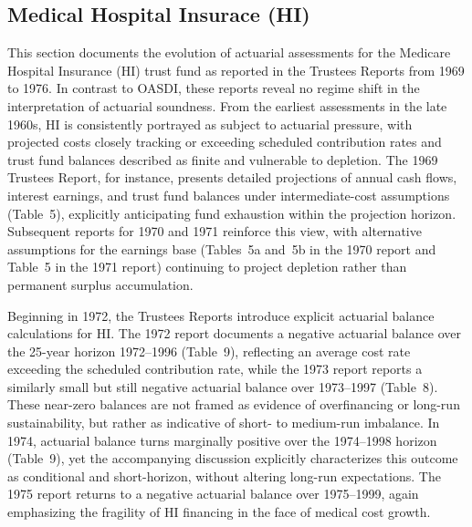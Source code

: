 \documentclass[12pt]{article}%
\theoremstyle{remark}
\begin{document}
\subsection*{Medical Hospital Insurace (HI)}

This section documents the evolution of actuarial assessments for the Medicare Hospital Insurance (HI) trust fund as reported in the Trustees Reports from 1969 to 1976. In contrast to OASDI, these reports reveal no regime shift in the interpretation of actuarial soundness. From the earliest assessments in the late 1960s, HI is consistently portrayed as subject to actuarial pressure, with projected costs closely tracking or exceeding scheduled contribution rates and trust fund balances described as finite and vulnerable to depletion. The 1969 Trustees Report, for instance, presents detailed projections of annual cash flows, interest earnings, and trust fund balances under intermediate-cost assumptions (Table~5), explicitly anticipating fund exhaustion within the projection horizon. Subsequent reports for 1970 and 1971 reinforce this view, with alternative assumptions for the earnings base (Tables~5a and~5b in the 1970 report and Table~5 in the 1971 report) continuing to project depletion rather than permanent surplus accumulation.

Beginning in 1972, the Trustees Reports introduce explicit actuarial balance calculations for HI. The 1972 report documents a negative actuarial balance over the 25-year horizon 1972--1996 (Table~9), reflecting an average cost rate exceeding the scheduled contribution rate, while the 1973 report reports a similarly small but still negative actuarial balance over 1973--1997 (Table~8). These near-zero balances are not framed as evidence of overfinancing or long-run sustainability, but rather as indicative of short- to medium-run imbalance. In 1974, actuarial balance turns marginally positive over the 1974--1998 horizon (Table~9), yet the accompanying discussion explicitly characterizes this outcome as conditional and short-horizon, without altering long-run expectations. The 1975 report returns to a negative actuarial balance over 1975--1999, again emphasizing the fragility of HI financing in the face of medical cost growth.
\end{document}

